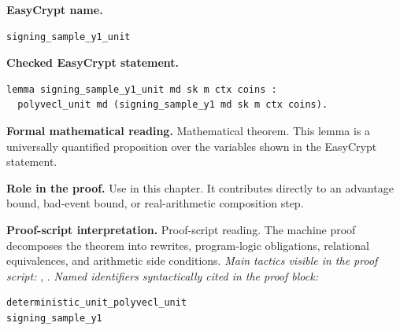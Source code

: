\begin{formaltheorem}
\noindent\textbf{EasyCrypt name.}
\begin{lstlisting}[language=EasyCrypt,basicstyle=\ttfamily\scriptsize]
signing_sample_y1_unit
\end{lstlisting}
\noindent\textbf{Checked EasyCrypt statement.}
\begin{lstlisting}[language=EasyCrypt,basicstyle=\ttfamily\scriptsize]
lemma signing_sample_y1_unit md sk m ctx coins :
  polyvecl_unit md (signing_sample_y1 md sk m ctx coins).
\end{lstlisting}
\noindent\textbf{Formal mathematical reading.}
Mathematical theorem. This lemma is a universally quantified proposition over the variables shown in the EasyCrypt statement.

\noindent\textbf{Role in the proof.}
Use in this chapter. It contributes directly to an advantage bound, bad-event bound, or real-arithmetic composition step.

\noindent\textbf{Proof-script interpretation.}
Proof-script reading. The machine proof decomposes the theorem into rewrites, program-logic obligations, relational equivalences, and arithmetic side conditions.
\emph{Main tactics visible in the proof script:} , .
\emph{Named identifiers syntactically cited in the proof block:}
\begin{lstlisting}[language=EasyCrypt,basicstyle=\ttfamily\scriptsize]
deterministic_unit_polyvecl_unit
signing_sample_y1
\end{lstlisting}

\end{formaltheorem}

